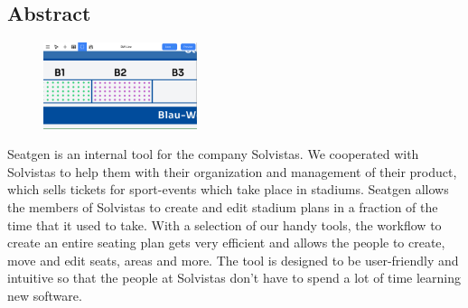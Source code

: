 \begin{spacing}{1}
    \chapter*{Abstract}
\end{spacing}
\begin{figure}
    \begin{center}
      \includegraphics[width=0.4\textwidth]{pics/abstract.png}
    \end{center}
\end{figure}
Seatgen is an internal tool for the company Solvistas. We cooperated with Solvistas to help them with their organization and management of their product, which sells tickets for sport-events which take place in stadiums. Seatgen allows the members of Solvistas to create and edit stadium plans in a fraction of the time that it used to take. With a selection of our handy tools, the workflow to create an entire seating plan gets very efficient and allows the people to create, move and edit seats, areas and more. The tool is designed to be user-friendly and intuitive so that the people at Solvistas don't have to spend a lot of time learning new software.
\newpage
